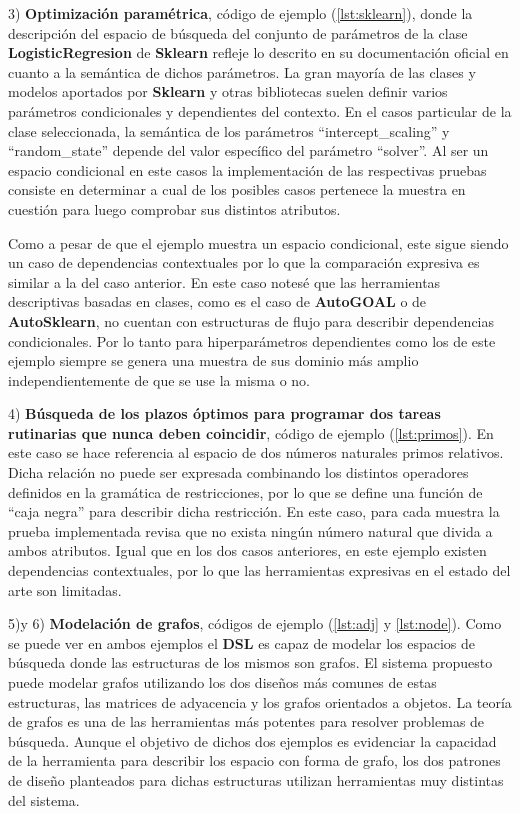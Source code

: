 3) {\bf Optimización paramétrica}, código de ejemplo (\ref{lst:sklearn}), donde la descripción del espacio de búsqueda del conjunto de parámetros de la clase
      {\bf LogisticRegresion} de {\bf Sklearn} refleje lo descrito en su documentación oficial en cuanto a la semántica de dichos
parámetros. La gran mayoría de las clases y modelos aportados por {\bf Sklearn} y otras bibliotecas suelen definir varios
parámetros condicionales y dependientes del contexto. En el casos particular de la clase seleccionada, la semántica
de los parámetros ``intercept_scaling'' y ``random_state'' depende del valor específico del parámetro ``solver''. Al ser
un espacio condicional en este casos la implementación de las respectivas pruebas consiste en determinar a cual de
los posibles casos pertenece la muestra en cuestión para luego comprobar sus distintos atributos.

Como a pesar de que el ejemplo muestra un espacio condicional, este sigue siendo un caso de dependencias contextuales
por lo que la comparación expresiva es similar a la del caso anterior. En este caso notesé que 
las herramientas descriptivas basadas en clases, como es el caso de {\bf AutoGOAL} o de {\bf AutoSklearn}, no cuentan con estructuras
de flujo para describir dependencias condicionales. Por lo tanto para hiperparámetros dependientes como los de este ejemplo siempre se genera
una muestra de sus dominio más amplio independientemente de que se use la misma o no.

4) {\bf Búsqueda de los plazos óptimos para programar dos tareas rutinarias que nunca deben coincidir}, código de ejemplo (\ref{lst:primos}). En este caso se hace
referencia al espacio de dos números naturales primos relativos. Dicha relación no puede ser expresada
combinando los distintos operadores definidos en la gramática de restricciones, por lo que se define una función de
``caja negra'' para describir dicha restricción. En este caso, para cada muestra la prueba implementada revisa que no
exista ningún número natural que divida a ambos atributos. Igual que en los dos casos anteriores, en este ejemplo existen
dependencias contextuales, por lo que las herramientas expresivas en el estado del arte son limitadas.

5)y 6) {\bf Modelación de grafos}, códigos de ejemplo (\ref{lst:adj} y \ref{lst:node}). Como se puede ver en ambos ejemplos el {\bf DSL} es capaz de modelar los espacios de búsqueda donde
las estructuras de los mismos son grafos. El sistema propuesto puede modelar grafos utilizando los dos diseños más comunes de
estas estructuras, las matrices de adyacencia y los grafos orientados a objetos. La teoría de grafos es una de las
herramientas más potentes para resolver problemas de búsqueda. Aunque el objetivo de dichos dos ejemplos es evidenciar 
la capacidad de la herramienta para describir los espacio con forma de grafo, 
los dos patrones de diseño planteados para dichas estructuras utilizan herramientas muy distintas del sistema.

